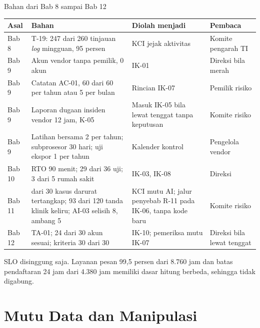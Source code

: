 \documentclass[aspectratio=169, table, 12pt]{beamer}
\begin{document}
\begin{frame}{{\Large Bahan dari Bab 8 sampai Bab 12}}
  \vspace{0pt}
  \tiny
  \begin{tabularx}{\textwidth}{|>{\raggedright\arraybackslash}p{}|>{\raggedright\arraybackslash}X|>{\raggedright\arraybackslash}p{}|>{\raggedright\arraybackslash}p{}|}
    \hline
    \textbf{Asal} & \textbf{Bahan} & \textbf{Diolah menjadi} & \textbf{Pembaca} \\ \hline
    Bab 8 & T-19: 247 dari 260 tinjauan \textit{log} mingguan, 95 persen & KCI jejak aktivitas &
    Komite pengarah TI \\ \hline
    Bab 9 & Akun vendor tanpa pemilik, 0 akun & IK-01 & Direksi bila merah \\ \hline
    Bab 9 & Catatan AC-01, 60 dari 60 per tahun atau 5 per bulan & Rincian IK-07 & Pemilik risiko
    \\ \hline
    Bab 9 & Laporan dugaan insiden vendor 12 jam, K-05 & Masuk IK-05 bila lewat tenggat tanpa
    keputusan & Komite risiko \\ \hline
    Bab 9 & Latihan bersama 2 per tahun; subprosesor 30 hari; uji ekspor 1 per tahun & Kalender
    kontrol & Pengelola vendor \\ \hline
    Bab 10 & RTO 90 menit; 29 dari 36 uji; 3 dari 5 rumah sakit & IK-03, IK-08 & Direksi \\ \hline
    Bab 11 & 27 dari 30 kasus darurat tertangkap; 93 dari 120 tanda klinik keliru; AI-03 selisih
    8, ambang 5 & KCI mutu AI; jalur penyebab R-11 pada IK-06, tanpa kode baru & Komite risiko \\
    \hline
    Bab 12 & TA-01; 24 dari 30 akun sesuai; kriteria 30 dari 30 & IK-10; pemeriksa mutu IK-07 &
    Direksi bila lewat tenggat \\ \hline
  \end{tabularx}

  \vspace{6pt}
  \scriptsize SLO disinggung saja. Layanan pesan 99,5 persen dari 8.760 jam dan batas pendaftaran
  24 jam dari 4.380 jam memiliki dasar hitung berbeda, sehingga tidak digabung.
\end{frame}

\section{Mutu Data dan Manipulasi}
\end{document}
